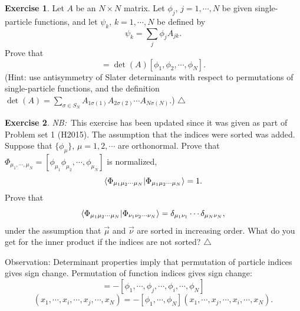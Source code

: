 \documentclass{report}
\theoremstyle{plain}
\theoremstyle{definition}
\newtheorem{exerc}{Exercise}[chapter]
\newcommand\xqed[1]{%
  \leavevmode\unskip\penalty9999 \hbox{}\nobreak\hfill
  \quad\hbox{#1}}
\newcommand\demo{\xqed{$\triangle$}}
\newenvironment{exercise}{\bigskip\begin{exerc}}{\demo\end{exerc}\bigskip}
\newcommand{\note}[1]{{\color{red}\emph{NB:}~#1}}
\begin{document}
\begin{exercise}\label{exercise:slater3}
   Let $A$ be an $N\times N$ matrix. Let $\phi_j$, $j=1,\cdots,N$ be
   given single-particle functions, and let $\psi_k$, $k=1,\cdots,N$ be
   defined by
   \begin{equation}
     \psi_k = \sum_j \phi_j A_{jk}.
   \end{equation}
   Prove that
   \begin{equation}
     [\psi_1,\psi_2,\cdots,\psi_N] =
     \det(A)[\phi_1,\phi_2,\cdots,\phi_N].
   \end{equation}
   (Hint: use antisymmetry of Slater determinants with respect to
   permutations of single-particle functions, and the definition
   $\det(A) = \sum_{\sigma\in S_N} A_{1\sigma(1)}A_{2\sigma(2)}
   \cdots A_{N\sigma(N)}.$)
 \end{exercise}


\begin{exercise}\label{exercise:slater2}\note{This exercise has been
    updated since it was given as part of Problem set 1 (H2015). The
    assumption that the indices were sorted was added.}
  Suppose that $\{\phi_\mu\}$, $\mu=1,2,\cdots$ are orthonormal.  Prove
  that $\Phi_{\mu_1,\cdots,\mu_N} =
  [\phi_{\mu_1}\phi_{\mu_2},\cdots,\phi_{\mu_N}]$ is normalized,
  \[ \braket{\Phi_{{\mu_1\mu_2\cdots \mu_N}}|\Phi_{{\mu_1\mu_2\cdots \mu_N}}} = 1. \]
  Prove that
  \[ \braket{\Phi_{\mu_1\mu_2\cdots
      \mu_N}|\Phi_{\nu_1\nu_2\cdots\nu_N}} = \delta_{\mu_1\nu_1}\cdots
  \delta_{\mu_N\nu_N}, \]
  under the assumption that $\vec{\mu}$ and $\vec{\nu}$ are sorted in
  increasing order. What do you get for the inner product if the indices are not sorted?
\end{exercise}



Observation: Determinant properties imply that permutation of particle
indices gives sign change. Permutation of function indices gives
sign change:
\begin{equation}
  [\phi_1,\cdots,\phi_i,\cdots,\phi_j,\cdots,\phi_N] =
  -[\phi_1,\cdots,\phi_j,\cdots,\phi_i,\cdots,\phi_N]
\end{equation}
\begin{equation}
  [\phi_1,\cdots,\phi_N](x_1,\cdots,x_i,\cdots,x_j,\cdots,x_N) =
  -[\phi_1,\cdots,\phi_N](x_1,\cdots,x_j,\cdots,x_i,\cdots,x_N). 
\end{equation}
\end{document}
